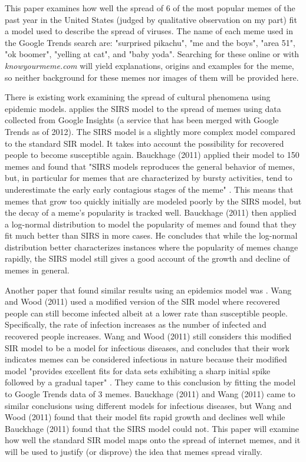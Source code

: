 \documentclass[12pt, letterpaper]{article}
\begin{document}
This paper examines how well the spread of 6 of the most popular memes of the past year in the United States (judged by qualitative observation on my part) fit a model used to describe the spread of viruses. The name of each meme used in the Google Trends search are: "surprised pikachu", "me and the boys", "area 51", "ok boomer", "yelling at cat", and "baby yoda". Searching for these online or with \textit{knowyourmeme.com} will yield explanations, origins and examples for the meme, so neither background for these memes nor images of them will be provided here.

There is existing work examining the spread of cultural phenomena using epidemic models. \cite{bauckhage2011insights} applies the SIRS model to the spread of memes using data collected from Google Insights (a service that has been merged with Google Trends as of 2012). The SIRS model is a slightly more complex model compared to the standard SIR model. It takes into account the possibility for recovered people to become susceptible again. Bauckhage (2011) applied their model to 150 memes and found that "SIRS models reproduces the general behavior of memes, but, in particular for memes that are characterized by bursty activities, tend to underestimate the early early contagious stages of the meme" \cite{bauckhage2011insights}. This means that memes that grow too quickly initially are modeled poorly by the SIRS model, but the decay of a meme's popularity is tracked well. Bauckhage (2011) then applied a log-normal distribution to model the popularity of memes and found that they fit much better than SIRS in more cases. He concludes that while the log-normal distribution better characterizes instances where the popularity of memes change rapidly, the SIRS model still gives a good account of the growth and decline of memes in general.

Another paper that found similar results using an epidemics model was \cite{wang2011epidemiological}. Wang and Wood (2011) used a modified version of the SIR model where recovered people can still become infected albeit at a lower rate than susceptible people. Specifically, the rate of infection increases as the number of infected and recovered people increases. Wang and Wood (2011) still considers this modified SIR model to be a model for infectious diseases, and concludes that their work indicates memes can be considered infectious in nature because their modified model "provides excellent fits for data sets exhibiting a sharp initial spike followed by a gradual taper" \cite{wang2011epidemiological}. They came to this conclusion by fitting the model to Google Trends data of 3 memes. Bauckhage (2011) and Wang (2011) came to similar conclusions using different models for infectious diseases, but Wang and Wood (2011) found that their model fits rapid growth and declines well while Bauckhage (2011) found that the SIRS model could not. This paper will examine how well the standard SIR model maps onto the spread of internet memes, and it will be used to justify (or disprove) the idea that memes spread virally.
\end{document}

